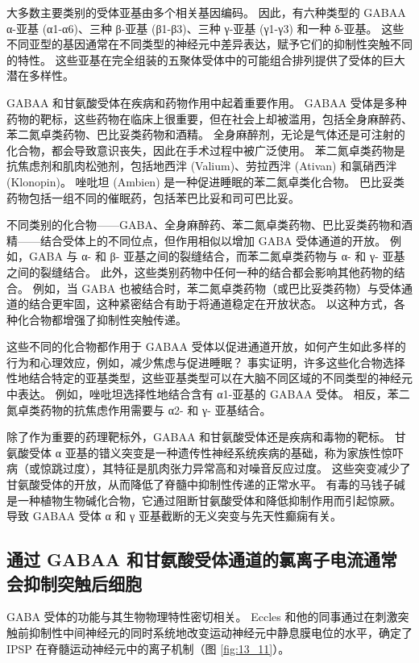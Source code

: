 大多数主要类别的受体亚基由多个相关基因编码。 
因此，有六种类型的 GABAA α-亚基 (α1-α6)、三种 β-亚基 (β1-β3)、三种 γ-亚基 (γ1-γ3) 和一种 δ-亚基。 
这些不同亚型的基因通常在不同类型的神经元中差异表达，赋予它们的抑制性突触不同的特性。 
这些亚基在完全组装的五聚体受体中的可能组合排列提供了受体的巨大潜在多样性。


GABAA 和甘氨酸受体在疾病和药物作用中起着重要作用。 
GABAA 受体是多种药物的靶标，这些药物在临床上很重要，但在社会上却被滥用，包括全身麻醉药、苯二氮卓类药物、巴比妥类药物和酒精。 
全身麻醉剂，无论是气体还是可注射的化合物，都会导致意识丧失，因此在手术过程中被广泛使用。 
苯二氮卓类药物是抗焦虑剂和肌肉松弛剂，包括地西泮 (Valium)、劳拉西泮 (Ativan) 和氯硝西泮 (Klonopin)。 
唑吡坦 (Ambien) 是一种促进睡眠的苯二氮卓类化合物。 
巴比妥类药物包括一组不同的催眠药，包括苯巴比妥和司可巴比妥。


不同类别的化合物——GABA、全身麻醉药、苯二氮卓类药物、巴比妥类药物和酒精——结合受体上的不同位点，但作用相似以增加 GABA 受体通道的开放。 
例如，GABA 与 α- 和 β- 亚基之间的裂缝结合，而苯二氮卓类药物与 α- 和 γ- 亚基之间的裂缝结合。 
此外，这些类别药物中任何一种的结合都会影响其他药物的结合。
例如，当 GABA 也被结合时，苯二氮卓类药物（或巴比妥类药物）与受体通道的结合更牢固，这种紧密结合有助于将通道稳定在开放状态。
以这种方式，各种化合物都增强了抑制性突触传递。


这些不同的化合物都作用于 GABAA 受体以促进通道开放，如何产生如此多样的行为和心理效应，例如，减少焦虑与促进睡眠？ 
事实证明，许多这些化合物选择性地结合特定的亚基类型，这些亚基类型可以在大脑不同区域的不同类型的神经元中表达。 
例如，唑吡坦选择性地结合含有 α1-亚基的 GABAA 受体。 
相反，苯二氮卓类药物的抗焦虑作用需要与 α2- 和 γ- 亚基结合。


除了作为重要的药理靶标外，GABAA 和甘氨酸受体还是疾病和毒物的靶标。
甘氨酸受体 α 亚基的错义突变是一种遗传性神经系统疾病的基础，称为家族性惊吓病（或惊跳过度），其特征是肌肉张力异常高和对噪音反应过度。
这些突变减少了甘氨酸受体的开放，从而降低了脊髓中抑制性传递的正常水平。 
有毒的马钱子碱是一种植物生物碱化合物，它通过阻断甘氨酸受体和降低抑制作用而引起惊厥。 
导致 GABAA 受体 α 和 γ 亚基截断的无义突变与先天性癫痫有关。


\subsection{通过 GABAA 和甘氨酸受体通道的氯离子电流通常会抑制突触后细胞}
GABA 受体的功能与其生物物理特性密切相关。 
Eccles 和他的同事通过在刺激突触前抑制性中间神经元的同时系统地改变运动神经元中静息膜电位的水平，确定了 IPSP 在脊髓运动神经元中的离子机制（图 \ref{fig:13_11}）。

